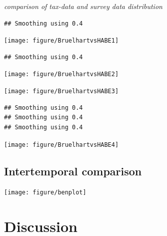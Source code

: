 \documentclass[twoside]{article}\usepackage[]{graphicx}\usepackage[]{color}
\makeatletter
\newenvironment{kframe}{%
 \def\at@end@of@kframe{}%
 \ifinner\ifhmode%
  \def\at@end@of@kframe{\end{minipage}}%
  \begin{minipage}{\columnwidth}%
 \fi\fi%
 \def\FrameCommand##1{\hskip\@totalleftmargin \hskip-\fboxsep
 \colorbox{shadecolor}{##1}\hskip-\fboxsep
     \hskip-\linewidth \hskip-\@totalleftmargin \hskip\columnwidth}%
 \MakeFramed {\advance\hsize-\width
   \@totalleftmargin\z@ \linewidth\hsize
   \@setminipage}}%
 {\par\unskip\endMakeFramed%
 \at@end@of@kframe}
\newenvironment{knitrout}{}{} %
\makeatother
\begin{document}
\begin{multicols}{2}
\emph{comparison of tax-data and survey data distribution}




\begin{knitrout}
\color{fgcolor}\begin{kframe}
\begin{verbatim}
## Smoothing using 0.4
\end{verbatim}
\end{kframe}
\texttt{[image: figure/BruelhartvsHABE1]} 
\begin{kframe}\begin{verbatim}
## Smoothing using 0.4
\end{verbatim}
\end{kframe}
\texttt{[image: figure/BruelhartvsHABE2]} 

\texttt{[image: figure/BruelhartvsHABE3]} 
\begin{kframe}\begin{verbatim}
## Smoothing using 0.4
## Smoothing using 0.4
## Smoothing using 0.4
\end{verbatim}
\end{kframe}
\texttt{[image: figure/BruelhartvsHABE4]} 

\end{knitrout}


\subsection{Intertemporal comparison}



\begin{knitrout}
\color{fgcolor}
\texttt{[image: figure/benplot]} 

\end{knitrout}




\section{Discussion}



\end{multicols}
\end{document}
